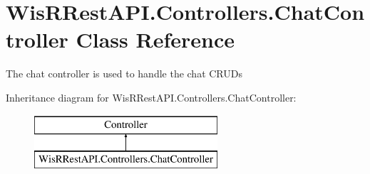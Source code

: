 \hypertarget{class_wis_r_rest_a_p_i_1_1_controllers_1_1_chat_controller}{}\section{Wis\+R\+Rest\+A\+P\+I.\+Controllers.\+Chat\+Controller Class Reference}
\label{class_wis_r_rest_a_p_i_1_1_controllers_1_1_chat_controller}


The chat controller is used to handle the chat C\+R\+U\+D\textquotesingle{}s  


Inheritance diagram for Wis\+R\+Rest\+A\+P\+I.\+Controllers.\+Chat\+Controller\+:\begin{figure}[H]
\begin{center}
\leavevmode
\includegraphics[height=2.000000cm]{class_wis_r_rest_a_p_i_1_1_controllers_1_1_chat_controller}
\end{center}
\end{figure}
